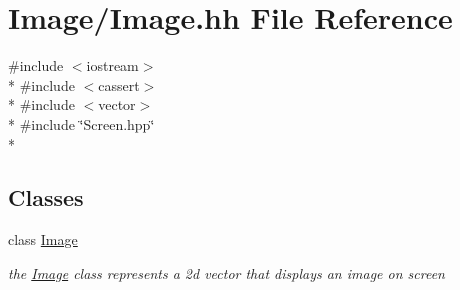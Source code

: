 \hypertarget{Image_8hh}{\section{Image/\-Image.hh File Reference}
\label{Image_8hh}
}
{\ttfamily \#include $<$iostream$>$}\\*
{\ttfamily \#include $<$cassert$>$}\\*
{\ttfamily \#include $<$vector$>$}\\*
{\ttfamily \#include \char`\"{}Screen.\-hpp\char`\"{}}\\*
\subsection*{Classes}
\begin{DoxyCompactItemize}
\item 
class \hyperlink{classImage}{Image}
\begin{DoxyCompactList}\small\item\em the \hyperlink{classImage}{Image} class represents a 2d vector that displays an image on screen \end{DoxyCompactList}\end{DoxyCompactItemize}
